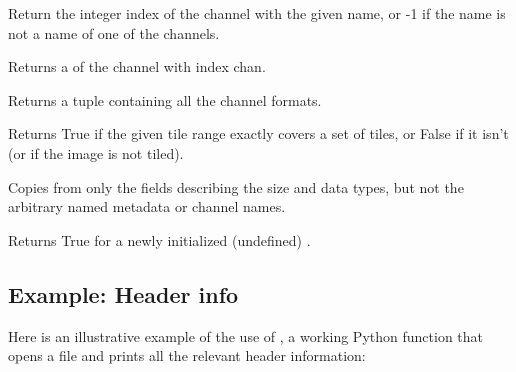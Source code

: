 \NEW %
Return the integer index of the channel with the given {\cf name}, or
-1 if the name is not a name of one of the channels.
\apiend

\NEW %
Returns a \TypeDesc of the channel with index {\cf chan}.
\apiend

\NEW %
Returns a tuple containing all the channel formats.
\apiend

\NEW %
Returns {\cf True} if the given tile range exactly covers a set of tiles, or
{\cf False} if it isn't (or if the image is not tiled).
\apiend

\NEW %
Copies from  only the fields describing the size
and data types, but not the arbitrary named metadata or channel names.
\apiend

\NEW %
Returns {\cf True} for a newly initialized (undefined) \ImageSpec.
\apiend

\newpage
\subsection*{Example: Header info}

Here is an illustrative example of the use of \ImageSpec, a working Python
function that opens a file and prints all the relevant header
information:

